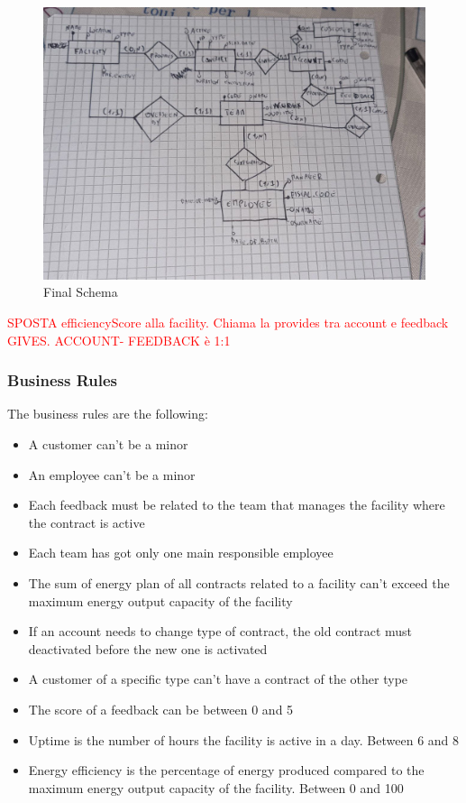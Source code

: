 \begin{figure}[H]
    \centering
    \includegraphics[width=\textwidth]{images/ER.png}
    \caption{Final Schema}
\end{figure}

\textcolor{red}{SPOSTA efficiencyScore alla facility. Chiama la provides tra account e feedback GIVES. ACCOUNT- FEEDBACK è 1:1}

\subsubsection{Business Rules}
The business rules are the following:
\begin{itemize}
    \item A customer can't be a minor
    \item An employee can't be a minor
    \item Each feedback must be related to the team that manages the facility where the contract is active
    \item Each team has got only one main responsible employee
    \item The sum of energy plan of all contracts related to a facility can't exceed the maximum energy output capacity of the facility
    \item If an account needs to change type of contract, the old contract must deactivated before the new one is activated
    \item A customer of a specific type can't have a contract of the other type
    \item The score of a feedback can be between 0 and 5
    \item Uptime is the number of hours the facility is active in a day. Between 6 and 8
    \item Energy efficiency is the percentage of energy produced compared to the maximum energy output capacity of the facility. Between 0 and 100
\end{itemize}



